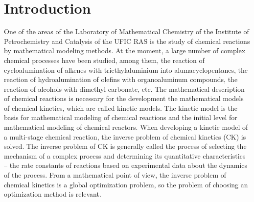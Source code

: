 \documentclass{svproc}
\begin{document}
\section{Introduction}


One of the areas of the Laboratory of Mathematical Chemistry of the Institute of Petrochemistry and Catalysis of the UFIC RAS is the study of chemical reactions by mathematical modeling methods. At the moment, a large number of complex chemical processes have been studied, among  them, the reaction of cycloalumination of alkenes with triethylaluminium into alumacyclopentanes, the reaction of hydroalumination of olefins with organoaluminum compounds, the reaction of alcohols with dimethyl carbonate, etc. The mathematical description of chemical reactions is necessary for the development the mathematical models of chemical kinetics, which are called kinetic models. The kinetic model is the basis for mathematical modeling of chemical reactions and the initial level for mathematical modeling of chemical reactors. When developing a kinetic model of a multi-stage chemical reaction, the inverse problem of chemical kinetics (CK) is solved. The inverse problem of CK is generally called the process of selecting the mechanism of a complex process and determining its quantitative characteristics -- the rate constants of reactions based on experimental data about the dynamics of the process. From a mathematical point of view, the inverse problem of chemical kinetics is a global optimization problem, so the problem of choosing an optimization method is relevant.
\end{document}
